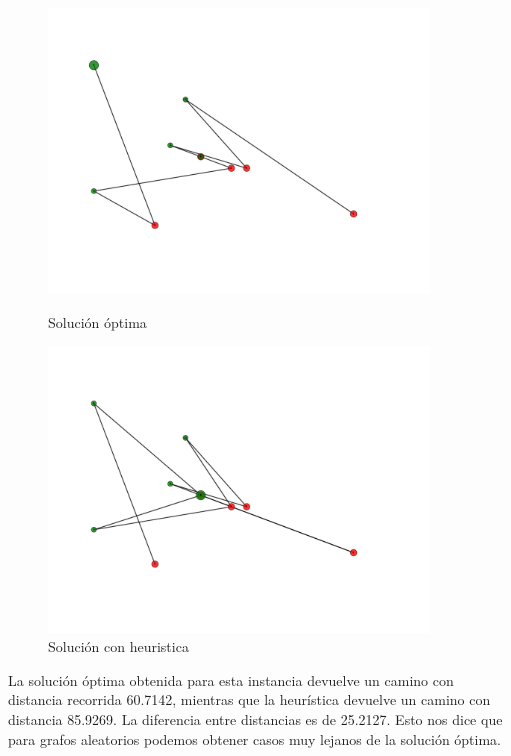 \begin{figure}[H]
\centering
\begin{minipage}{0.45\textwidth}
\centering
\includegraphics[width=0.9\textwidth]{imagenes/test4-soltest4BT.pdf}
\caption{Solución óptima}
\label{fig:ej2_caso4bt}
\end{minipage}
\qquad
\begin{minipage}{0.45\textwidth}
\centering
\includegraphics[width=0.9\textwidth]{imagenes/test4-soltest4H.pdf}
\caption{Solución con heuristica}
\label{fig:ej2_caso4h}
\end{minipage}
\end{figure}

La solución óptima obtenida para esta instancia devuelve un camino con distancia recorrida 60.7142, mientras que la heurística devuelve un camino con distancia 85.9269. La diferencia entre distancias es de 25.2127. Esto nos dice que para grafos aleatorios podemos obtener casos muy lejanos de la solución óptima.

